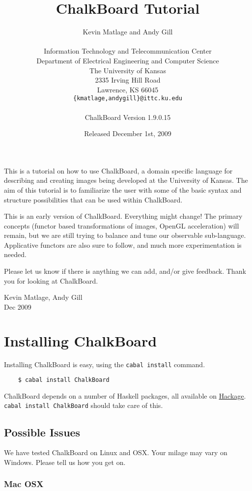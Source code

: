 \documentclass{article}
\title{ChalkBoard Tutorial}
\author{Kevin Matlage and Andy Gill\\
\\
Information Technology and Telecommunication Center\\
Department of Electrical Engineering and Computer Science\\
The University of Kansas\\
2335 Irving Hill Road\\
Lawrence, KS 66045\\
        \texttt{\{kmatlage,andygill\}@ittc.ku.edu}\\
\\
ChalkBoard Version 1.9.0.15
}
\date{Released December 1st, 2009}
\begin{document}
\maketitle

This is a tutorial on how to use ChalkBoard, a domain specific
language for describing and creating images being developed at the
University of Kansas. The aim of this tutorial is to familiarize the
user with some of the basic syntax and structure
possibilities that can be used within ChalkBoard.

This is an early version of ChalkBoard. Everything might change! The
primary concepts (functor based transformations of images, OpenGL acceleration) 
will remain, but we are still trying to balance and tune our observable sub-language.
Applicative functors are also sure to follow, and much more experimentation is needed.

Please let us know if there is anything we can add, and/or give feedback.
Thank you for looking at ChalkBoard.
\vskip 0.1in

Kevin Matlage, Andy Gill\\
Dec 2009

\newpage
\tableofcontents

\newpage
\listoffigures

\newpage
\section{Installing ChalkBoard}

Installing ChalkBoard is easy, using the \verb|cabal install| command.
\begin{verbatim}
    $ cabal install ChalkBoard
\end{verbatim}
ChalkBoard depends on a number of Haskell packages, all available on 
\href{http://hackage.haskell.org/}{Hackage}. \verb|cabal install ChalkBoard| should take care of this. 


\subsection{Possible Issues}

We have tested ChalkBoard on Linux and OSX. Your milage may vary on Windows. Please tell us how you get on.

\subsubsection{Mac OSX}
\end{document}
